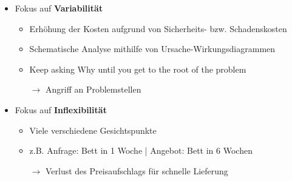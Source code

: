 \documentclass[11pt,a4paper]{article}
\begin{document}
\begin{itemize}
\begin{itemize}
	\item Fokus auf \textbf{Variabilität}
		\begin{itemize}
		\item Erhöhung der Kosten aufgrund von Sicherheits- bzw. Schadenskosten
		\item Schematische Analyse mithilfe von Ursache-Wirkungsdiagrammen
		\item Keep asking Why until you get to the root of the problem
		\item[$\rightarrow$] Angriff an Problemstellen
		\end{itemize}
		
	\item Fokus auf \textbf{Inflexibilität}
		\begin{itemize}
		\item Viele verschiedene Gesichtspunkte
		\item z.B. Anfrage: Bett in 1 Woche | Angebot: Bett in 6 Wochen
		\item[$\rightarrow$] Verlust des Preisaufschlags für schnelle Lieferung		
		
		\end{itemize}
	
	\end{itemize}
\end{itemize}
\end{document}
